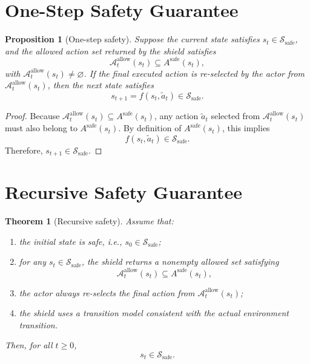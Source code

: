 \documentclass[11pt]{article}
\newtheorem{proposition}{Proposition}
\newtheorem{theorem}{Theorem}
\begin{document}
\section{One-Step Safety Guarantee}
 
\begin{proposition}[One-step safety]
Suppose the current state satisfies $s_t \in \mathcal S_{\mathrm{safe}}$, and the allowed action set returned by the shield satisfies
\begin{equation}
\mathcal A_t^{\mathrm{allow}}(s_t) \subseteq A^{\mathrm{safe}}(s_t),
\end{equation}
with $\mathcal A_t^{\mathrm{allow}}(s_t) \neq \varnothing$. If the final executed action is re-selected by the actor from $\mathcal A_t^{\mathrm{allow}}(s_t)$, then the next state satisfies
\begin{equation}
s_{t+1} = f(s_t,\tilde a_t) \in \mathcal S_{\mathrm{safe}}.
\end{equation}
\end{proposition}

\begin{proof}
Because $\mathcal A_t^{\mathrm{allow}}(s_t) \subseteq A^{\mathrm{safe}}(s_t)$, any action $\tilde a_t$ selected from $\mathcal A_t^{\mathrm{allow}}(s_t)$ must also belong to $A^{\mathrm{safe}}(s_t)$. By definition of $A^{\mathrm{safe}}(s_t)$, this implies
\begin{equation}
f(s_t,\tilde a_t) \in \mathcal S_{\mathrm{safe}}.
\end{equation}
Therefore, $s_{t+1} \in \mathcal S_{\mathrm{safe}}$.
\end{proof}

\section{Recursive Safety Guarantee}

\begin{theorem}[Recursive safety]
Assume that:
\begin{enumerate}[label=(\arabic*),leftmargin=1.8em]
    \item the initial state is safe, i.e., $s_0 \in \mathcal S_{\mathrm{safe}}$;
    \item for any $s_t \in \mathcal S_{\mathrm{safe}}$, the shield returns a nonempty allowed set satisfying
    \begin{equation}
    \mathcal A_t^{\mathrm{allow}}(s_t) \subseteq A^{\mathrm{safe}}(s_t),
    \end{equation}
    \item the actor always re-selects the final action from $\mathcal A_t^{\mathrm{allow}}(s_t)$;
    \item the shield uses a transition model consistent with the actual environment transition.
\end{enumerate}
Then, for all $t \ge 0$,
\begin{equation}
s_t \in \mathcal S_{\mathrm{safe}}.
\end{equation}
\end{theorem}
\end{document}
